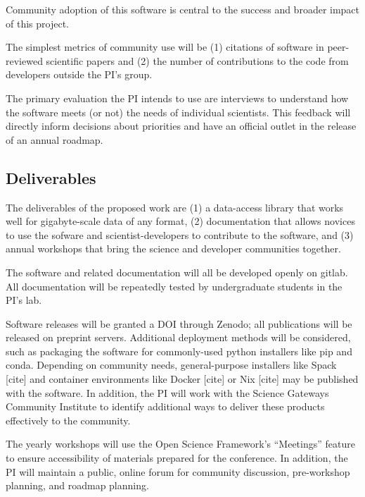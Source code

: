 Community adoption of this software is central to the success and broader impact of this project.

The simplest metrics of community use will be (1) citations of software in peer-reviewed scientific papers and (2) the number of contributions to the code from developers outside the PI's group.

The primary evaluation the PI intends to use are interviews to understand how the software meets (or not) the needs of individual scientists.  This feedback will directly inform decisions about priorities and have an official outlet in the release of an annual roadmap.  


\subsection{Deliverables}
The deliverables of the proposed work are (1) a data-access library that works well for gigabyte-scale data of any format, (2) documentation that allows novices to use the sofware and scientist-developers to contribute to the software, and (3) annual workshops that bring the science and developer communities together.

The software and related documentation will all be developed openly on gitlab.  All documentation will be repeatedly tested by undergraduate students in the PI's lab.

Software releases will be granted a DOI through Zenodo; all publications will be released on preprint servers.  Additional deployment methods will be considered, such as packaging the software for commonly-used python installers like pip and conda.  Depending on community needs, general-purpose installers like Spack [cite] and container environments like Docker [cite] or Nix [cite] may be published with the software.  In addition, the PI will work with the Science Gateways Community Institute to identify additional ways to deliver these products effectively to the community.

The yearly workshops will use the Open Science Framework's ``Meetings'' feature to ensure accessibility of materials prepared for the conference.  In addition, the PI will maintain a public, online forum for community discussion, pre-workshop planning, and roadmap planning.


